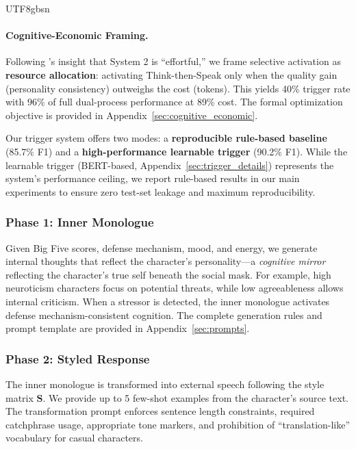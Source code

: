 \documentclass[11pt]{article}
\begin{document}
\begin{CJK*}{UTF8}{gbsn}
\paragraph{Cognitive-Economic Framing.} Following \citet{kahneman2011thinking}'s insight that System 2 is ``effortful,'' we frame selective activation as \textbf{resource allocation}: activating Think-then-Speak only when the quality gain (personality consistency) outweighs the cost (tokens). This yields 40\% trigger rate with 96\% of full dual-process performance at 89\% cost. The formal optimization objective is provided in Appendix~\ref{sec:cognitive_economic}.

Our trigger system offers two modes: a \textbf{reproducible rule-based baseline} (85.7\% F1) and a \textbf{high-performance learnable trigger} (90.2\% F1). While the learnable trigger (BERT-based, Appendix~\ref{sec:trigger_details}) represents the system's performance ceiling, we report rule-based results in our main experiments to ensure zero test-set leakage and maximum reproducibility.



\subsubsection{Phase 1: Inner Monologue}
\label{sec:inner}

Given Big Five scores, defense mechanism, mood, and energy, we generate internal thoughts that reflect the character's personality---a \textit{cognitive mirror} reflecting the character's true self beneath the social mask. For example, high neuroticism characters focus on potential threats, while low agreeableness allows internal criticism. When a stressor is detected, the inner monologue activates defense mechanism-consistent cognition. The complete generation rules and prompt template are provided in Appendix~\ref{sec:prompts}.

\subsubsection{Phase 2: Styled Response}

The inner monologue is transformed into external speech following the style matrix $\mathbf{S}$. We provide up to 5 few-shot examples from the character's source text. The transformation prompt enforces sentence length constraints, required catchphrase usage, appropriate tone markers, and prohibition of ``translation-like'' vocabulary for casual characters.



\end{CJK*}
\end{document}
